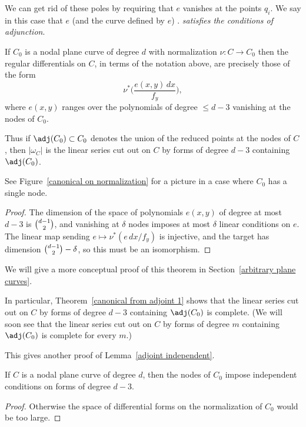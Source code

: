 We can get rid of these poles by requiring that $e$ vanishes at the
points $q_i$. We say in this case that $e$ (and the curve defined by $e$)
 .
\emph{satisfies the conditions of adjunction}.

\begin{theorem}\label{canonical from adjoint 1}
If $C_{0}$ is a nodal plane curve of degree $d$ with normalization $\nu:
C\to C_{0}$
then the  regular differentials on  $C$, in terms of the notation above,
 are precisely those of the form
 $$
\nu^{*}\biggl( \frac{e(x,y)\,dx}{f_{y}}\biggr)
,
$$
where
$e(x,y)$ ranges over the polynomials of degree $\leq d-3$
vanishing at the nodes of $C_{0}$.

Thus if $\adj(C_{0})\subset C_{0}$ denotes the union
%
of the reduced points at the nodes of $C$, then $|\omega_{C}|$ is the
linear series cut out on $C$ by
forms of degree $d-3$ containing $\adj(C_{0})$.
\unif
\end{theorem}

See Figure~\ref{canonical on normalization} for a picture in a case
where $C_0$ has a single node.
\begin{proof}
The dimension of the space of polynomials $e(x,y)$ of degree at most
$d-3$ is $\tbinom{d-1}{2}$,
and vanishing at $\delta$ nodes imposes at most $\delta$ linear conditions
on $e$. The linear map sending
$e\mapsto \nu^{*}(e\,dx/f_{y})$ is injective, and the target has dimension
$\tbinom{d-1}{2}-\delta$, so this must be an isomorphism.
\end{proof}
We will give a more conceptual proof of this theorem in
Section~\ref{arbitrary plane curves}.

In particular, Theorem~\ref{canonical from adjoint 1}
shows that the linear series cut out on $C$ by
forms of degree $d-3$ containing $\adj(C_{0})$ is complete. (We will
soon see that
 the linear series cut out on $C$ by
forms of degree $m$ containing $\adj(C_{0})$ is complete for every $m$.)


This gives another proof of Lemma~\ref{adjoint independent}.

\begin{corollary}
If $C$ is a nodal plane curve of degree $d$, then the nodes of $C_{0}$
impose independent
%
conditions on forms of degree $d-3$.
\unif
\end{corollary}

\begin{proof}
 Otherwise the space of differential forms on the normalization of $C_{0}$
 would be too large.
\end{proof}

